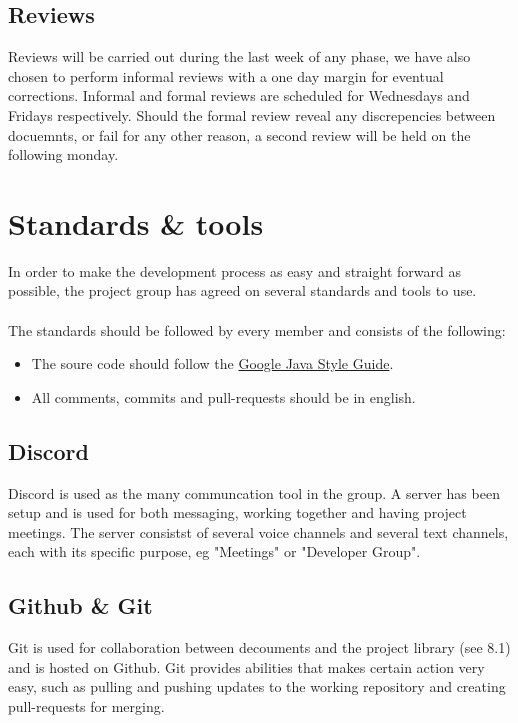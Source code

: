 \documentclass{article}
\begin{document}
    \subsection{Reviews}
        Reviews will be carried out during the last week of any phase, we have also chosen to perform informal reviews with a one day margin for eventual corrections. Informal and formal reviews are scheduled for Wednesdays and Fridays respectively. Should the formal review reveal any discrepencies between docuemnts, or fail for any other reason, a second review will be held on the following monday.
    
    \subsection{}

\section{Standards \& tools}    %
    In order to make the development process as easy and straight forward as possible,
    the project group has agreed on several standards and tools to use. 
    \\ \\
    The standards should be followed by every member and consists of the following:
    \begin{itemize}
        \item The soure code should follow the
        \href{https://google.github.io/styleguide/javaguide.html}{Google Java Style Guide}.
        \item All comments, commits and pull-requests should be in english.
    \end{itemize}
    
    \subsection{Discord}
    Discord is used as the many communcation tool in the group. A server has been setup and is
    used for both messaging, working together and having project meetings.
    The server consistst of several voice channels and several text channels, each
    with its specific purpose, eg "Meetings" or "Developer Group".
    
    \subsection{Github \& Git}
    Git is used for collaboration between decouments and the project library (see 8.1)
    and is hosted on Github. Git provides abilities that  makes certain action very
    easy, such as pulling and pushing updates to the working repository and creating pull-requests for merging.
    
\end{document}
